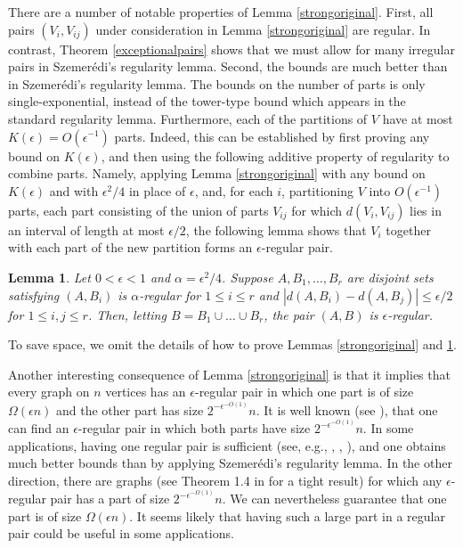\documentclass[11pt]{article}
\newtheorem{lemma}{Lemma}[section]
\begin{document}
\begin{itemize}
There are a number of notable properties of Lemma \ref{strongoriginal}. First,
all pairs $(V_i,V_{ij})$ under consideration in Lemma \ref{strongoriginal} are
regular. In contrast, Theorem \ref{exceptionalpairs} shows that we must allow
for many irregular pairs in Szemer\'edi's regularity lemma.  Second, the bounds
are much better than in Szemer\'edi's regularity lemma. The bounds on the
number of parts is only single-exponential, instead of the tower-type bound
which appears in the standard regularity lemma. Furthermore, each of the
partitions of $V$ have at most $K(\epsilon)=O(\epsilon^{-1})$ parts. Indeed,
this can be established by first proving any bound on $K(\epsilon)$, and then
using the following additive property of regularity to combine parts. Namely,
applying Lemma \ref{strongoriginal} with any bound on $K(\epsilon)$ and with
$\epsilon^2 /4$ in place of $\epsilon$, and, for each $i$, partitioning $V$
into $O(\epsilon^{-1})$ parts, each part consisting of the union of parts
$V_{ij}$ for which $d(V_i,V_{ij})$ lies in an interval of length at most
$\epsilon/2$, the following lemma shows that $V_i$ together with each part of
the new partition forms an  $\epsilon$-regular pair.

\begin{lemma}\label{alepsi}
Let $0<\epsilon<1$ and $\alpha=\epsilon^2/4$. Suppose $A,B_1,\ldots,B_r$ are
disjoint sets satisfying $(A,B_i)$ is $\alpha$-regular for $1 \leq i \leq r$
and $|d(A,B_i)-d(A,B_j)| \leq \epsilon/2$ for $1 \leq i,j \leq r$. Then,
letting $B=B_1 \cup \ldots \cup B_r$, the pair $(A,B)$ is $\epsilon$-regular.
\end{lemma}

To save space, we omit the details of how to prove Lemmas \ref{strongoriginal}
and \ref{alepsi}.

Another interesting consequence of Lemma \ref{strongoriginal} is that it
implies that every graph on $n$ vertices has an $\epsilon$-regular pair in
which one part is of size $\Omega(\epsilon n)$ and the other part has size
$2^{-\epsilon^{-O(1)}}n$. It is well known (see \cite{KoSi}), that one can find
an $\epsilon$-regular pair in which both parts have size
$2^{-\epsilon^{-O(1)}}n$. In some applications, having one regular pair is
sufficient  (see, e.g., \cite{Ea}, \cite{Ha}, \cite{KoSi}), and one obtains
much better bounds than by applying Szemer\'edi's regularity lemma. In the
other direction, there are graphs (see Theorem 1.4 in \cite{PRR} for a tight
result) for which any $\epsilon$-regular pair has a part of size
$2^{-\epsilon^{-\Omega(1)}}n$. We can nevertheless guarantee that one part is
of size $\Omega(\epsilon n)$. It seems likely that having such a large part in
a regular pair could be useful in some applications.


\end{itemize}
\end{document}
